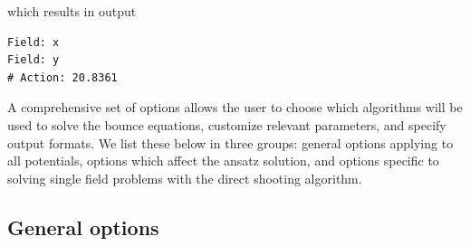 \documentclass[final,3p,11pt,pdflatex]{elsarticle}
\begin{document}
which results in output

\begin{lstlisting}[language={}]
Field: x
Field: y
# Action: 20.8361
\end{lstlisting}

A comprehensive set of options allows the user to choose which algorithms will
be used to solve the bounce equations, customize relevant parameters, and
specify output formats. We list these below in three groups: general options
applying to all potentials, options which affect the ansatz solution, and
options specific to solving single field problems with the direct shooting
algorithm.

\subsection{General options}
\end{document}
